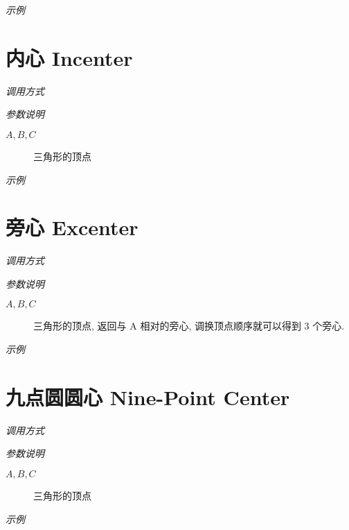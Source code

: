\emph{示例}


\section{内心 Incenter}

\emph{调用方式}

\begin{tcolorbox}{}
\end{tcolorbox}

\emph{参数说明}

\begin{description}
  \item[$A,B,C$] 三角形的顶点
\end{description}

\emph{示例}


\section{旁心 Excenter}

\emph{调用方式}

\begin{tcolorbox}{}
\end{tcolorbox}

\emph{参数说明}

\begin{description}
  \item[$A,B,C$] 三角形的顶点, 返回与 A 相对的旁心, 调换顶点顺序就可以得到 3 个旁心.
\end{description}

\emph{示例}


\section{九点圆圆心 Nine-Point Center}

\emph{调用方式}

\begin{tcolorbox}{}
\end{tcolorbox}

\emph{参数说明}

\begin{description}
  \item[$A,B,C$] 三角形的顶点
\end{description}

\emph{示例}

